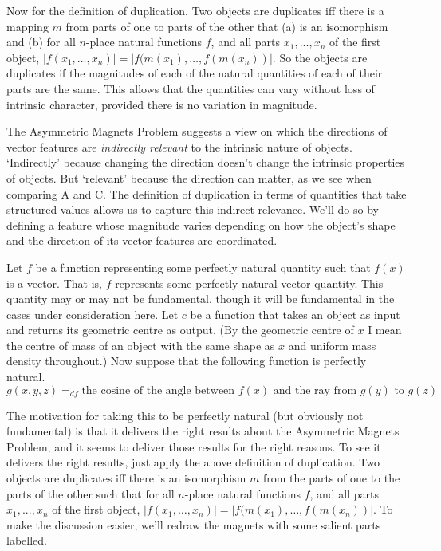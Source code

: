 Now for the definition of duplication. Two objects are duplicates iff there is a mapping \(m\) from parts of one to parts of the other that (a) is an isomorphism and (b) for all \(n\)-place natural functions \(f\), and all parts \(x_1, ..., x_n\)  of the first object, \(|f(x_1,\dots, x_n)| = |f(m(x_1),\dots,f(m(x_n))|\). So the objects are duplicates if the magnitudes of each of the natural quantities of each of their parts are the same. This allows that the quantities can vary without loss of intrinsic character, provided there is no variation in magnitude.

The Asymmetric Magnets Problem suggests a view on which the directions of vector features are \textit{indirectly relevant} to the intrinsic nature of objects. `Indirectly' because changing the direction doesn't change the intrinsic properties of objects. But `relevant' because the direction can matter, as we see when comparing A and C. The definition of duplication in terms of quantities that take structured values allows us to capture this indirect relevance. We'll do so by defining a feature whose magnitude varies depending on how the object's shape and the direction of its vector features are coordinated.

Let \(f\) be a function representing some perfectly natural quantity such that \(f(x)\) is a vector. That is, \(f\) represents some perfectly natural vector quantity. This quantity may or may not be fundamental, though it will be fundamental in the cases under consideration here. Let \(c\) be a function that takes an object as input and returns its geometric centre as output. (By the geometric centre of \(x\) I mean the centre of mass of an object with the same shape as \(x\) and uniform mass density throughout.) Now suppose that the following function is perfectly natural. 
\begin{equation}
g(x, y, z) =_{df} \text{the cosine of the angle between }f(x)\text{ and the ray from }g(y)\text{ to }g(z)
\end{equation}

\noindent The motivation for taking this to be perfectly natural (but obviously not fundamental) is that it delivers the right results about the Asymmetric Magnets Problem, and it seems to deliver those results for the right reasons. To see it delivers the right results, just apply the above definition of duplication. Two objects are duplicates iff there is an isomorphism  \(m\) from the parts of one to the parts of the other such that for all \(n\)-place natural functions \(f\), and all parts \(x_1, ..., x_n\)  of the first object, \(|f(x_1,\dots, x_n)| = |f(m(x_1),\dots,f(m(x_n))|\). To make the discussion easier, we'll redraw the magnets with some salient parts labelled.

